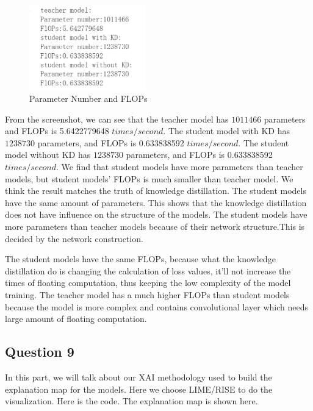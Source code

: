 \documentclass[conference]{IEEEtran}
\begin{document}
  \begin{figure}[h] 
      \centering
      \includegraphics[width=0.45\textwidth]{./graphs/T1Q8.png}
      \caption{Parameter Number and FLOPs}
      \label{Fig.t1q3e}
  \end{figure}
  From the screenshot, we can see that the teacher model has $1011466$ parameters and FLOPs is 5.6422779648 $times/second$. 
  The student model with KD has $1238730$ parameters, and FLOPs is 0.633838592 $times/second$. 
  The student model without KD has $1238730$ parameters, and FLOPs is 0.633838592 $times/second$. 
  We find that student models have more parameters than teacher models, but student models' FLOPs is much smaller than teacher model. We think the result matches the truth of knowledge distillation.
  The student models have the same amount of parameters. This shows that the knowledge distillation does not have influence on the structure of the models. The student models have more parameters than teacher models because of their network structure.This is decided by the network construction. \par
  The student models have the same FLOPs, because what the knowledge distillation do is changing the calculation of loss values, it'll not increase the times of floating computation, thus keeping the low complexity of the model training. The teacher model has a much higher FLOPs than student models because the model is more complex and contains convolutional layer which needs large amount of floating computation.
  \subsection{Question 9}
  In this part, we will talk about our XAI methodology used to build the explanation map for the models.
  Here we choose LIME/RISE to do the visualization.
  Here is the code.%
  The explanation map is shown here.
\end{document}
